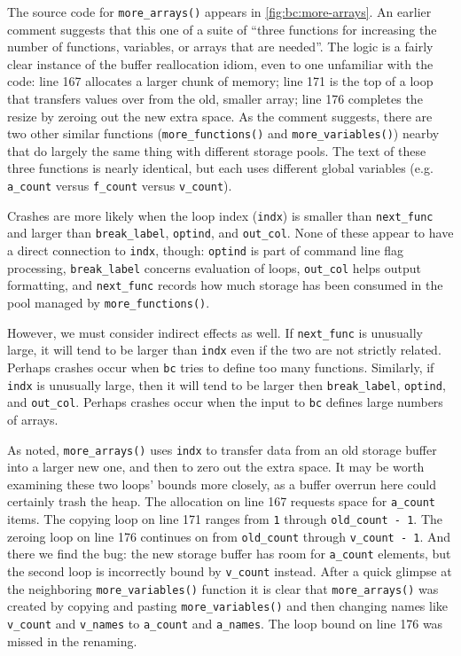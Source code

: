 
The source code for \texttt{more\_arrays()} appears in
\autoref{fig:bc:more-arrays}.  An earlier comment suggests that this
one of a suite of ``three functions for increasing the number of
functions, variables, or arrays that are needed''.  The logic is a
fairly clear instance of the buffer reallocation idiom, even to one
unfamiliar with the code: line 167 allocates a larger chunk of memory;
line 171 is the top of a loop that transfers values over from the old,
smaller array; line 176 completes the resize by zeroing out the new
extra space.  As the comment suggests, there are two other similar
functions (\texttt{more\_functions()} and \texttt{more\_variables()})
nearby that do largely the same thing with different storage pools.
The text of these three functions is nearly identical, but each uses
different global variables (e.g. \texttt{a\_count} versus
\texttt{f\_count} versus \texttt{v\_count}).

Crashes are more likely when the loop index (\texttt{indx}) is smaller
than \texttt{next\_func} and larger than \texttt{break\_label},
\texttt{optind}, and \texttt{out\_col}.  None of these appear to have
a direct connection to \texttt{indx}, though: \texttt{optind} is part
of command line flag processing, \texttt{break\_label} concerns
evaluation of loops, \texttt{out\_col} helps output formatting, and
\texttt{next\_func} records how much storage has been consumed in the
pool managed by \texttt{more\_functions()}.

However, we must consider indirect effects as well.  If
\texttt{next\_func} is unusually large, it will tend to be larger than
\texttt{indx} even if the two are not strictly related.  Perhaps
crashes occur when \texttt{bc} tries to define too many functions.
Similarly, if \texttt{indx} is unusually large, then it will tend to
be larger then \texttt{break\_label}, \texttt{optind}, and
\texttt{out\_col}.  Perhaps crashes occur when the input to
\texttt{bc} defines large numbers of arrays.

As noted, \texttt{more\_arrays()} uses \texttt{indx} to transfer data
from an old storage buffer into a larger new one, and then to zero out
the extra space.  It may be worth examining these two loops' bounds
more closely, as a buffer overrun here could certainly trash the heap.
The allocation on line 167 requests space for \texttt{a\_count} items.
The copying loop on line 171 ranges from \texttt{1} through
\texttt{old\_count - 1}.  The zeroing loop on line 176 continues on
from \texttt{old\_count} through \texttt{v\_count - 1}.  And there we
find the bug: the new storage buffer has room for \texttt{a\_count}
elements, but the second loop is incorrectly bound by
\texttt{v\_count} instead.  After a quick glimpse at the neighboring
\texttt{more\_variables()} function it is clear that
\texttt{more\_arrays()} was created by copying and pasting
\texttt{more\_variables()} and then changing names like
\texttt{v\_count} and \texttt{v\_names} to \texttt{a\_count} and
\texttt{a\_names}.  The loop bound on line 176 was missed in the
renaming.

